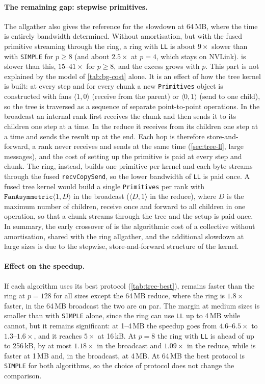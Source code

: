 \paragraph{The remaining gap: stepwise primitives.}
The allgather also gives the reference for the slowdown at 64\,MB, where the time is entirely bandwidth determined. Without amortisation, but with the fused primitive streaming through the ring, a ring with \texttt{LL} is about $9\times$ slower than with \texttt{SIMPLE} for $p\ge8$ (and about $2.5\times$ at $p=4$, which stays on NVLink).
\bine{} is slower than this, $15$--$41\times$ for $p\ge8$, and the excess grows with $p$.
This part is not explained by the model of \cref{tab:bg-cost} alone. It is an effect of how the tree kernel is built: at every step and for every chunk a new \texttt{Primitives} object is constructed with fans $\langle1,0\rangle$ (receive from the parent) or $\langle0,1\rangle$ (send to one child), so the tree is traversed as a sequence of separate point-to-point operations.
In the broadcast an internal rank first receives the chunk and then sends it to its children one step at a time. In the reduce it receives from its children one step at a time and sends the result up at the end.
Each hop is therefore store-and-forward, a rank never receives and sends at the same time (\cref{sec:tree-ll}, large messages), and the cost of setting up the primitive is paid at every step and chunk.
The ring, instead, builds one primitive per kernel and each byte streams through the fused \texttt{recvCopySend}, so the lower bandwidth of \texttt{LL} is paid once.
A fused tree kernel would build a single \texttt{Primitives} per rank with $\texttt{FanAsymmetric}\langle1,D\rangle$ in the broadcast ($\langle D,1\rangle$ in the reduce), where $D$ is the maximum number of children, receive once and forward to all children in one operation, so that a chunk streams through the tree and the setup is paid once. %
In summary, the early crossover of \bine{} is the algorithmic cost of a collective without amortisation, shared with the ring allgather, and the additional slowdown at large sizes is due to the stepwise, store-and-forward structure of the kernel.

\paragraph{Effect on the speedup.}
If each algorithm uses its best protocol (\cref{tab:tree-best}), \bine{} remains faster than the ring at $p=128$ for all sizes except the 64\,MB reduce, where the ring is $1.8\times$ faster, in the 64\,MB broadcast the two are on par.
The margin at medium sizes is smaller than with \texttt{SIMPLE} alone, since the ring can use \texttt{LL} up to 4\,MB while \bine{} cannot, but it remains significant: at 1--4\,MB the speedup goes from $4.6$--$6.5\times$ to $1.3$--$1.6\times$, and it reaches $5\times$ at 16\,kB.
At $p=8$ the ring with \texttt{LL} is ahead of \bine{} up to 256\,kB, by at most $1.18\times$ in the broadcast and $1.09\times$ in the reduce, while \bine{} is faster at 1\,MB and, in the broadcast, at 4\,MB.
At 64\,MB the best protocol is \texttt{SIMPLE} for both algorithms, so the choice of protocol does not change the comparison.

